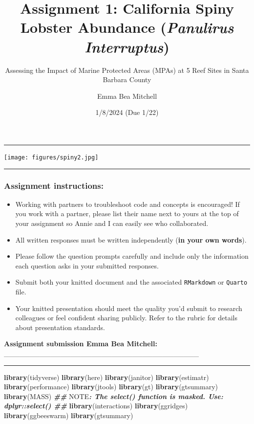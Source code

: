 \documentclass[
]{article}
\title{Assignment 1: California Spiny Lobster Abundance (\emph{Panulirus
Interruptus})}
\subtitle{Assessing the Impact of Marine Protected Areas (MPAs) at 5
Reef Sites in Santa Barbara County}
\author{Emma Bea Mitchell}
\date{1/8/2024 (Due 1/22)}
\newenvironment{Shaded}{\begin{snugshade}}{\end{snugshade}}
\newcommand{\AlertTok}[1]{\textcolor[rgb]{0.94,0.16,0.16}{#1}}
\newcommand{\DocumentationTok}[1]{\textcolor[rgb]{0.56,0.35,0.01}{\textbf{\textit{#1}}}}
\newcommand{\FunctionTok}[1]{\textcolor[rgb]{0.13,0.29,0.53}{\textbf{#1}}}
\newcommand{\NormalTok}[1]{#1}
\begin{document}
\maketitle

\begin{center}\rule{0.5\linewidth}{0.5pt}\end{center}

\texttt{[image: figures/spiny2.jpg]}

\begin{center}\rule{0.5\linewidth}{0.5pt}\end{center}

\subsubsection{Assignment instructions:}\label{assignment-instructions}

\begin{itemize}
\item
  Working with partners to troubleshoot code and concepts is encouraged!
  If you work with a partner, please list their name next to yours at
  the top of your assignment so Annie and I can easily see who
  collaborated.
\item
  All written responses must be written independently (\textbf{in your
  own words}).
\item
  Please follow the question prompts carefully and include only the
  information each question asks in your submitted responses.
\item
  Submit both your knitted document and the associated
  \texttt{RMarkdown} or \texttt{Quarto} file.
\item
  Your knitted presentation should meet the quality you'd submit to
  research colleagues or feel confident sharing publicly. Refer to the
  rubric for details about presentation standards.
\end{itemize}

\textbf{Assignment submission Emma Bea Mitchell:}
\_\_\_\_\_\_\_\_\_\_\_\_\_\_\_\_\_\_\_\_\_\_\_\_\_\_\_\_\_\_\_\_\_\_\_\_\_\_

\begin{center}\rule{0.5\linewidth}{0.5pt}\end{center}

\begin{Shaded}
\begin{Highlighting}[]
\FunctionTok{library}\NormalTok{(tidyverse)}
\FunctionTok{library}\NormalTok{(here)}
\FunctionTok{library}\NormalTok{(janitor)}
\FunctionTok{library}\NormalTok{(estimatr)  }
\FunctionTok{library}\NormalTok{(performance)}
\FunctionTok{library}\NormalTok{(jtools)}
\FunctionTok{library}\NormalTok{(gt)}
\FunctionTok{library}\NormalTok{(gtsummary)}
\FunctionTok{library}\NormalTok{(MASS) }\DocumentationTok{\#\# }\AlertTok{NOTE}\DocumentationTok{: The \textasciigrave{}select()\textasciigrave{} function is masked. Use: \textasciigrave{}dplyr::select()\textasciigrave{} \#\#}
\FunctionTok{library}\NormalTok{(interactions) }
\FunctionTok{library}\NormalTok{(ggridges)}
\FunctionTok{library}\NormalTok{(ggbeeswarm)}
\FunctionTok{library}\NormalTok{(gtsummary)}
\end{Highlighting}
\end{Shaded}
\end{document}
